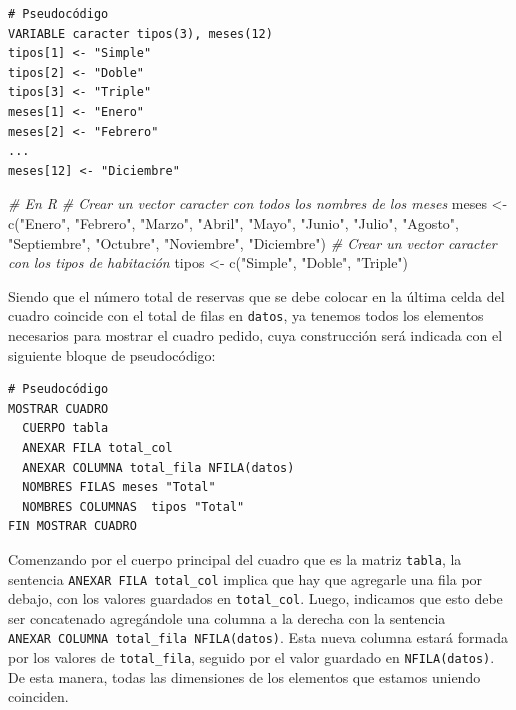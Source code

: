 \documentclass[
]{book}
\newenvironment{Shaded}{\begin{snugshade}}{\end{snugshade}}
\newcommand{\CommentTok}[1]{\textcolor[rgb]{0.56,0.35,0.01}{\textit{#1}}}
\newcommand{\FunctionTok}[1]{\textcolor[rgb]{0.00,0.00,0.00}{#1}}
\newcommand{\NormalTok}[1]{#1}
\newcommand{\OtherTok}[1]{\textcolor[rgb]{0.56,0.35,0.01}{#1}}
\newcommand{\StringTok}[1]{\textcolor[rgb]{0.31,0.60,0.02}{#1}}
\begin{document}
\begin{verbatim}
# Pseudocódigo
VARIABLE caracter tipos(3), meses(12)
tipos[1] <- "Simple"
tipos[2] <- "Doble"
tipos[3] <- "Triple"
meses[1] <- "Enero"
meses[2] <- "Febrero"
...
meses[12] <- "Diciembre"
\end{verbatim}

\begin{Shaded}
\begin{Highlighting}[]
\CommentTok{\# En R}
\CommentTok{\# Crear un vector caracter con todos los nombres de los meses}
\NormalTok{meses }\OtherTok{\textless{}{-}} \FunctionTok{c}\NormalTok{(}\StringTok{"Enero"}\NormalTok{, }\StringTok{"Febrero"}\NormalTok{, }\StringTok{"Marzo"}\NormalTok{, }\StringTok{"Abril"}\NormalTok{,}
           \StringTok{"Mayo"}\NormalTok{, }\StringTok{"Junio"}\NormalTok{, }\StringTok{"Julio"}\NormalTok{, }\StringTok{"Agosto"}\NormalTok{,}
           \StringTok{"Septiembre"}\NormalTok{, }\StringTok{"Octubre"}\NormalTok{, }\StringTok{"Noviembre"}\NormalTok{, }\StringTok{"Diciembre"}\NormalTok{)}
\CommentTok{\# Crear un vector caracter con los tipos de habitación}
\NormalTok{tipos }\OtherTok{\textless{}{-}} \FunctionTok{c}\NormalTok{(}\StringTok{"Simple"}\NormalTok{, }\StringTok{"Doble"}\NormalTok{, }\StringTok{"Triple"}\NormalTok{)}
\end{Highlighting}
\end{Shaded}

Siendo que el número total de reservas que se debe colocar en la última celda del cuadro coincide con el total de filas en \texttt{datos}, ya tenemos todos los elementos necesarios para mostrar el cuadro pedido, cuya construcción será indicada con el siguiente bloque de pseudocódigo:

\begin{verbatim}
# Pseudocódigo
MOSTRAR CUADRO
  CUERPO tabla
  ANEXAR FILA total_col
  ANEXAR COLUMNA total_fila NFILA(datos)
  NOMBRES FILAS meses "Total"
  NOMBRES COLUMNAS  tipos "Total"
FIN MOSTRAR CUADRO
\end{verbatim}

Comenzando por el cuerpo principal del cuadro que es la matriz \texttt{tabla}, la sentencia \texttt{ANEXAR\ FILA\ total\_col} implica que hay que agregarle una fila por debajo, con los valores guardados en \texttt{total\_col}. Luego, indicamos que esto debe ser concatenado agregándole una columna a la derecha con la sentencia \texttt{ANEXAR\ COLUMNA\ total\_fila\ NFILA(datos)}. Esta nueva columna estará formada por los valores de \texttt{total\_fila}, seguido por el valor guardado en \texttt{NFILA(datos)}. De esta manera, todas las dimensiones de los elementos que estamos uniendo coinciden.
\end{document}
